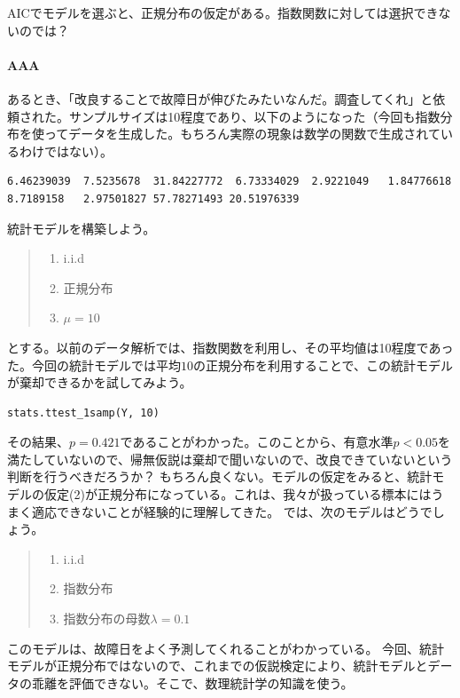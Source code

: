 AICでモデルを選ぶと、正規分布の仮定がある。指数関数に対しては選択できないのでは？ 
\fi




\paragraph{AAA}
あるとき、「改良することで故障日が伸びたみたいなんだ。調査してくれ」と依頼された。サンプルサイズは10程度であり、以下のようになった（今回も指数分布を使ってデータを生成した。もちろん実際の現象は数学の関数で生成されているわけではない）。

\begin{lstlisting}
6.46239039  7.5235678  31.84227772  6.73334029  2.9221049   1.84776618  8.7189158   2.97501827 57.78271493 20.51976339
\end{lstlisting}

統計モデルを構築しよう。
\begin{quote}
    \begin{enumerate}[(1)]
\item i.i.d
\item 正規分布
\item $\mu=10$
\end{enumerate}
\end{quote}

とする。以前のデータ解析では、指数関数を利用し、その平均値は10程度であった。今回の統計モデルでは平均$10$の正規分布を利用することで、この統計モデルが棄却できるかを試してみよう。



\begin{lstlisting}
stats.ttest_1samp(Y, 10)
\end{lstlisting}




その結果、$p=0.421$であることがわかった。このことから、有意水準$p<0.05$を満たしていないので、帰無仮説は棄却で聞いないので、改良できていないという判断を行うべきだろうか？
もちろん良くない。モデルの仮定をみると、統計モデルの仮定(2)が正規分布になっている。これは、我々が扱っている標本にはうまく適応できないことが経験的に理解してきた。
では、次のモデルはどうでしょう。

\begin{quote}
    \begin{enumerate}[(1)]
\item i.i.d
\item 指数分布
\item 指数分布の母数$\lambda=0.1$
\end{enumerate}
\end{quote}
このモデルは、故障日をよく予測してくれることがわかっている。
今回、統計モデルが正規分布ではないので、これまでの仮説検定により、統計モデルとデータの乖離を評価できない。そこで、数理統計学の知識を使う。

